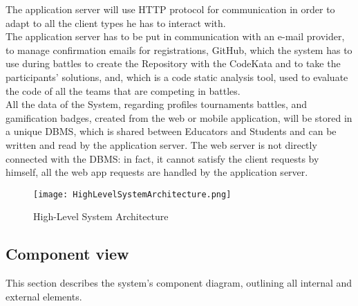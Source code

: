 \documentclass{article}
\begin{document}
The application server will use HTTP protocol for communication in order to adapt to all the client types he has to interact with.\\
The application server has to be put in communication with an e-mail provider, to manage confirmation emails for registrations, GitHub, which the system has to use during battles to create the Repository with the CodeKata and to take the participants' solutions, and, which is a code static analysis tool, used to evaluate the code of all the teams that are competing in battles.\\
All the data of the System, regarding profiles tournaments battles, and gamification badges, created from the web or mobile application, will be stored in a unique DBMS, which is shared between Educators and Students and can be written and read by the application server.
The web server is not directly connected with the DBMS: in fact, it cannot satisfy the client requests by himself, all the web app requests are handled by the application server.


\begin{figure}[H]
    \centering
    \texttt{[image: HighLevelSystemArchitecture.png]}
    \caption{High-Level System Architecture}
\end{figure}
\newpage

\subsection{Component view}
This section describes the system's component diagram, outlining all internal and external elements.
\end{document}
